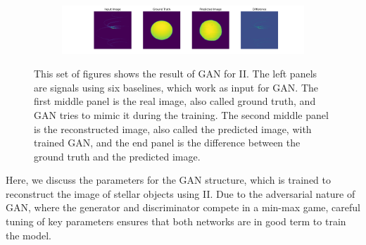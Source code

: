 \begin{figure}
\begin{subfigure}{\linewidth}
	\end{subfigure}
	\begin{subfigure}{\linewidth}
		\includegraphics[width=\linewidth]{fig/testing_image/image_47.png}
	\end{subfigure}
	\caption{This set of figures shows the result of GAN for II. The left panels are signals using six baselines, which work as input for GAN. The first middle panel is the real image, also called ground truth, and GAN tries to mimic it during the training. The second middle panel is the reconstructed image, also called the predicted image, with trained GAN, and the end panel is the difference between the ground truth and the predicted image.}
	\label{fig:GAN}
\end{figure}
Here, we discuss the parameters for the GAN structure, which is trained to reconstruct the image of stellar objects using II. Due to the adversarial nature of GAN, where the generator and discriminator compete in a min-max game, careful tuning of key parameters ensures that both networks are in good term to train the model.

